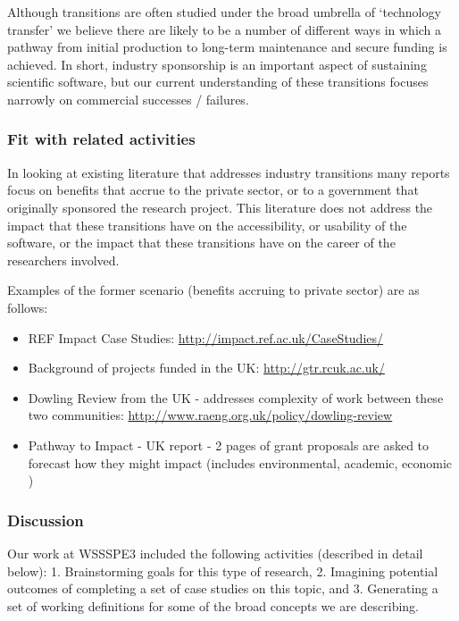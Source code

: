 Although transitions are often studied under the broad umbrella of `technology transfer' we believe there are likely to be a number of different ways in which a pathway from initial production to long-term maintenance and secure funding is achieved. In short, industry sponsorship is an important aspect of sustaining scientific software, but our current understanding of these transitions focuses narrowly on commercial successes / failures.

\subsubsection{Fit with related activities}

In looking at existing literature that addresses industry transitions many reports focus on benefits that accrue to the private sector, or to a government that originally sponsored the research project. This literature does not address the impact that these transitions have on the accessibility, or usability of the software, or the impact that these transitions have on the career of the researchers involved. 

Examples of the former scenario (benefits accruing to private sector) are as follows:

\begin{itemize}
\item REF Impact Case Studies: \url{http://impact.ref.ac.uk/CaseStudies/}
\item Background of projects funded in the UK: \url{http://gtr.rcuk.ac.uk/}
\item Dowling Review from the UK - addresses complexity of work between these two communities: \url{http://www.raeng.org.uk/policy/dowling-review}
\item Pathway to Impact - UK report  - 2 pages of grant proposals are asked to forecast how they might impact (includes environmental, academic, economic )
\end{itemize}

\subsubsection{Discussion}

Our work at WSSSPE3 included the following activities (described in detail below): 1. Brainstorming goals for this type of research, 2. Imagining potential outcomes of completing a set of case studies on this topic, and 3. Generating a set of working definitions for some of the broad concepts we are describing. 

